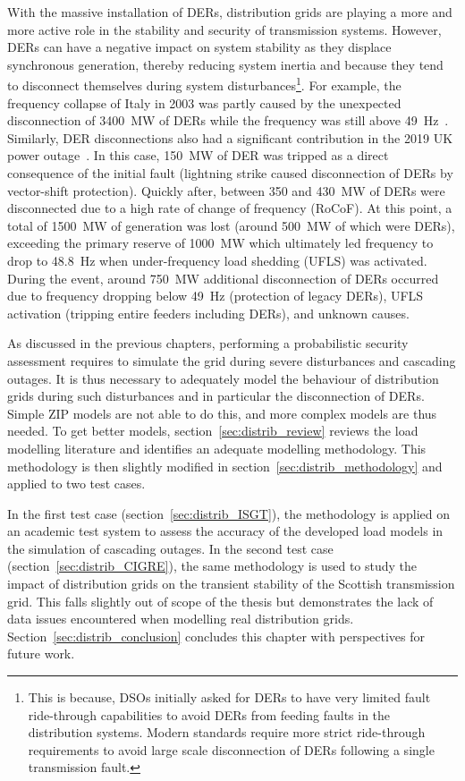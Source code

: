 With the massive installation of DERs, distribution grids are playing a more and more active role in the stability and security of transmission systems. However, DERs can have a negative impact on system stability as they displace synchronous generation, thereby reducing system inertia and because they tend to disconnect themselves during system disturbances\footnote{This is because, DSOs initially asked for DERs to have very limited fault ride-through capabilities to avoid DERs from feeding faults in the distribution systems. Modern standards require more strict ride-through requirements to avoid large scale disconnection of DERs following a single transmission fault.}. For example, the frequency collapse of Italy in 2003 was partly caused by the unexpected disconnection of 3400~MW of DERs while the frequency was still above 49~Hz~\cite[p115]{Italy2003}. Similarly, DER disconnections also had a significant contribution in the 2019 UK power outage~\cite{2019UKBlackout}. In this case, 150~MW of DER was tripped as a direct consequence of the initial fault (lightning strike caused disconnection of DERs by vector-shift protection). Quickly after, between 350 and 430~MW of DERs were disconnected due to a high rate of change of frequency (RoCoF). At this point, a total of 1500~MW of generation was lost (around 500~MW of which were DERs), exceeding the primary reserve of 1000~MW which ultimately led frequency to drop to 48.8~Hz when under-frequency load shedding (UFLS) was activated. During the event, around 750~MW additional disconnection of DERs occurred due to frequency dropping below 49~Hz (protection of legacy DERs), UFLS activation (tripping entire feeders including DERs), and unknown causes. %

As discussed in the previous chapters, performing a probabilistic security assessment requires to simulate the grid during severe disturbances and cascading outages. It is thus necessary to adequately model the behaviour of distribution grids during such disturbances and in particular the disconnection of DERs. Simple ZIP models are not able to do this, and more complex models are thus needed. To get better models, section~\ref{sec:distrib_review} reviews the load modelling literature and identifies an adequate modelling methodology. This methodology is then slightly modified in section~\ref{sec:distrib_methodology} and applied to two test cases.

In the first test case (section~\ref{sec:distrib_ISGT}), the methodology is applied on an academic test system to assess the accuracy of the developed load models in the simulation of cascading outages. In the second test case (section~\ref{sec:distrib_CIGRE}), the same methodology is used to study the impact of distribution grids on the transient stability of the Scottish transmission grid. This falls slightly out of scope of the thesis but demonstrates the lack of data issues encountered when modelling real distribution grids. Section~\ref{sec:distrib_conclusion} concludes this chapter with perspectives for future work.


